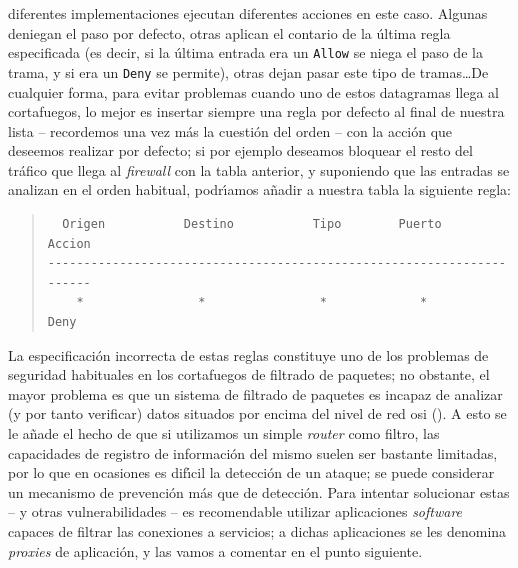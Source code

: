diferentes implementaciones ejecutan diferentes acciones en este caso. Algunas
deniegan el paso por defecto, otras aplican el contario de la \'ultima regla
especificada (es decir, si la \'ultima entrada era un {\tt Allow} se niega el
paso de la trama, y si era un {\tt Deny} se permite), otras dejan pasar este
tipo de tramas\ldots De cualquier forma, para evitar problemas cuando uno de
estos datagramas llega al cortafuegos, lo mejor es insertar siempre una regla
por defecto al final de nuestra lista -- recordemos una vez m\'as la cuesti\'on
del orden -- con la acci\'on que deseemos realizar por defecto; si por 
ejemplo deseamos bloquear el resto del tr\'afico que llega al {\it firewall} con
la tabla anterior, y suponiendo que las entradas se analizan en el orden 
habitual, podr\'{\i}amos a\~nadir a nuestra tabla la siguiente regla:
\begin{quote}
\begin{verbatim}
  Origen           Destino           Tipo        Puerto        Accion
----------------------------------------------------------------------
    *                *                *             *           Deny
\end{verbatim}
\end{quote}
La especificaci\'on incorrecta de estas reglas constituye uno de los problemas 
de seguridad habituales en los cortafuegos de filtrado de paquetes; no obstante,
el mayor problema es que un sistema de filtrado de paquetes es incapaz de
analizar (y por tanto verificar) datos situados por encima del nivel de red 
{\sc osi} (\cite{kn:ste98}). A esto se le a\~nade el hecho de que si utilizamos
un simple {\it router} como filtro, las capacidades de registro de informaci\'on
del mismo suelen ser bastante limitadas, por lo que en ocasiones es 
dif\'{\i}cil la detecci\'on de un ataque; se puede considerar un mecanismo de
prevenci\'on m\'as que de detecci\'on. Para intentar solucionar estas -- y 
otras vulnerabilidades -- es recomendable utilizar aplicaciones {\it software}
capaces de filtrar las conexiones a servicios; a dichas aplicaciones se les 
denomina {\it proxies} de aplicaci\'on, y las vamos a comentar en el punto
siguiente.

